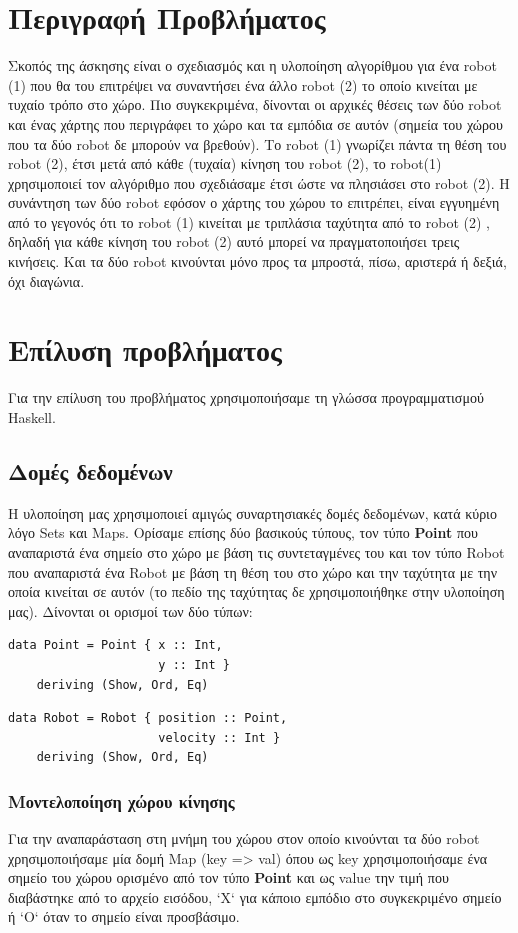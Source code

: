 \documentclass[12pt]{article}
\begin{document}
\pagebreak

\section{Περιγραφή Προβλήματος}
Σκοπός της άσκησης είναι ο σχεδιασμός και η υλοποίηση αλγορίθμου για ένα robot (1) που θα του επιτρέψει να συναντήσει ένα άλλο robot (2) το οποίο κινείται με τυχαίο τρόπο στο χώρο. Πιο συγκεκριμένα, δίνονται οι αρχικές θέσεις των δύο robot και ένας χάρτης που περιγράφει το χώρο και τα εμπόδια σε αυτόν (σημεία του χώρου που τα δύο robot δε μπορούν να βρεθούν). Το robot (1) γνωρίζει πάντα τη θέση του robot (2), έτσι μετά από κάθε (τυχαία) κίνηση του robot (2), το robot(1) χρησιμοποιεί τον αλγόριθμο που σχεδιάσαμε έτσι ώστε να πλησιάσει στο robot (2). Η συνάντηση των δύο robot εφόσον ο χάρτης του χώρου το επιτρέπει, είναι εγγυημένη από το γεγονός ότι το robot (1) κινείται με τριπλάσια ταχύτητα από το robot (2) , δηλαδή για κάθε κίνηση του robot (2) αυτό μπορεί να πραγματοποιήσει τρεις κινήσεις. Και τα δύο robot κινούνται μόνο προς τα μπροστά, πίσω, αριστερά ή δεξιά, όχι διαγώνια.
\section{Επίλυση προβλήματος}
Για την επίλυση του προβλήματος χρησιμοποιήσαμε τη γλώσσα προγραμματισμού Haskell.
\subsection{Δομές δεδομένων}
Η υλοποίηση μας χρησιμοποιεί αμιγώς συναρτησιακές δομές δεδομένων, κατά κύριο λόγο Sets και Maps. Ορίσαμε επίσης δύο βασικούς τύπους, τον τύπο \textbf{Point} που αναπαριστά ένα σημείο στο χώρο με βάση τις συντεταγμένες του και τον τύπο Robot που αναπαριστά ένα Robot με βάση τη θέση του στο χώρο και την ταχύτητα με την οποία κινείται σε αυτόν (το πεδίο της ταχύτητας δε χρησιμοποιήθηκε στην υλοποίηση μας). Δίνονται οι ορισμοί των δύο τύπων:
\begin{verbatim}
data Point = Point { x :: Int,
                     y :: Int }
    deriving (Show, Ord, Eq)
\end{verbatim}

\begin{verbatim}
data Robot = Robot { position :: Point,
                     velocity :: Int }
    deriving (Show, Ord, Eq)
\end{verbatim}
\subsubsection{Μοντελοποίηση χώρου κίνησης}
Για την αναπαράσταση στη μνήμη του χώρου στον οποίο κινούνται τα δύο robot χρησιμοποιήσαμε μία δομή Map (key => val) όπου ως key χρησιμοποιήσαμε ένα σημείο του χώρου ορισμένο από τον τύπο \textbf{Point} και ως value την τιμή που διαβάστηκε από το αρχείο εισόδου, `Χ` για κάποιο εμπόδιο στο συγκεκριμένο σημείο ή `Ο` όταν το σημείο είναι προσβάσιμο. 
\end{document}
